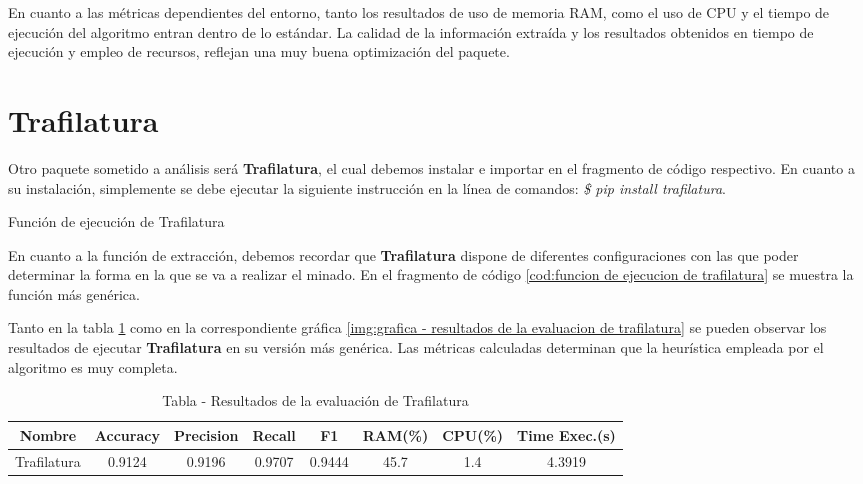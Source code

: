 En cuanto a las métricas dependientes del entorno, tanto los resultados de uso de memoria RAM, como el uso
de CPU y el tiempo de ejecución del algoritmo entran dentro de lo estándar. La calidad de la información
extraída y los resultados obtenidos en tiempo de ejecución y empleo de recursos, reflejan una muy buena
optimización del paquete.

\section*{Trafilatura}

Otro paquete sometido a análisis será \textbf{Trafilatura}, el cual debemos instalar e importar 
en el fragmento de código respectivo. En cuanto a su instalación, simplemente se debe ejecutar la siguiente 
instrucción en la línea de comandos: \emph{\$ pip install trafilatura}.

\begin{codefloat}
    
    \caption{Función de ejecución de Trafilatura}
    \label{cod:funcion de ejecucion de trafilatura}
\end{codefloat}

En cuanto a la función de extracción, debemos recordar que \textbf{Trafilatura} dispone de diferentes
configuraciones con las que poder determinar la forma en la que se va a realizar el minado. En el fragmento
de código \ref{cod:funcion de ejecucion de trafilatura} se muestra la función más genérica.

Tanto en la tabla \ref{tab:tabla - resultados de la evaluacion de trafilatura} como en la correspondiente
gráfica \ref{img:grafica - resultados de la evaluacion de trafilatura} se pueden observar los resultados
de ejecutar \textbf{Trafilatura} en su versión más genérica. Las métricas calculadas determinan que la
heurística empleada por el algoritmo es muy completa.

\begin{table}[h]
    \begin{center}
      \begin{tabular}{| c | c | c | c | c | c | c | c |} \hline 
       \textbf{Nombre} & \textbf{Accuracy} & \textbf{Precision}  & \textbf{Recall} & \textbf{F1} & \textbf{RAM(\%)} & \textbf{CPU(\%)} & \textbf{Time Exec.(s)} \\ \hline
       Trafilatura & 0.9124 & 0.9196 & 0.9707 & 0.9444 & 45.7 & 1.4 & 4.3919 \\ \hline
      \end{tabular}
      \caption{Tabla - Resultados de la evaluación de Trafilatura}
      \label{tab:tabla - resultados de la evaluacion de trafilatura}
    \end{center}
\end{table}

